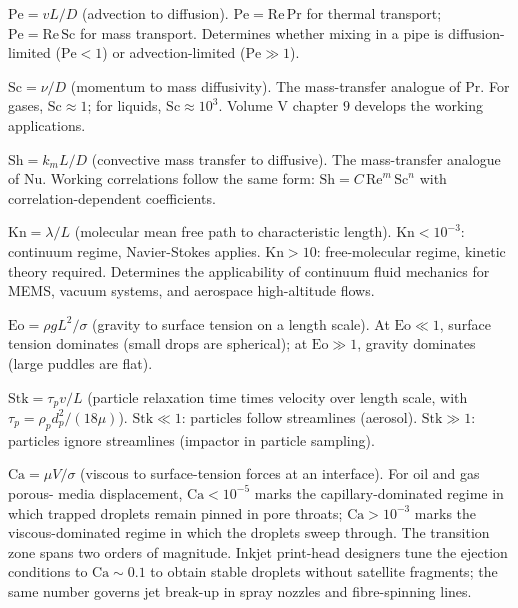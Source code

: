  $\mathrm{Pe} = vL/D$ (advection to
diffusion). $\mathrm{Pe} = \mathrm{Re}\,\mathrm{Pr}$ for thermal
transport; $\mathrm{Pe} = \mathrm{Re}\,\mathrm{Sc}$ for mass
transport. Determines whether mixing in a pipe is diffusion-
limited ($\mathrm{Pe} < 1$) or advection-limited ($\mathrm{Pe}
\gg 1$).

 $\mathrm{Sc} = \nu/D$ (momentum to mass
diffusivity). The mass-transfer analogue of $\mathrm{Pr}$. For
gases, $\mathrm{Sc} \approx 1$; for liquids, $\mathrm{Sc} \approx
10^{3}$. Volume V chapter $9$ develops the working applications.

 $\mathrm{Sh} = k_{m} L/D$ (convective
mass transfer to diffusive). The mass-transfer analogue of
$\mathrm{Nu}$. Working correlations follow the same form:
$\mathrm{Sh} = C\,\mathrm{Re}^{m}\,\mathrm{Sc}^{n}$ with
correlation-dependent coefficients.

 $\mathrm{Kn} = \lambda/L$ (molecular mean
free path to characteristic length). $\mathrm{Kn} < 10^{-3}$:
continuum regime, Navier-Stokes applies. $\mathrm{Kn} > 10$:
free-molecular regime, kinetic theory required. Determines the
applicability of continuum fluid mechanics for MEMS, vacuum
systems, and aerospace high-altitude flows.

 $\mathrm{Eo} = \rho g L^{2}/
\sigma$ (gravity to surface tension on a length scale). At
$\mathrm{Eo} \ll 1$, surface tension dominates (small drops are
spherical); at $\mathrm{Eo} \gg 1$, gravity dominates (large
puddles are flat).

 $\mathrm{Stk} = \tau_{p} v/L$ (particle
relaxation time times velocity over length scale, with $\tau_{p}
= \rho_{p} d_{p}^{2}/(18\mu)$). $\mathrm{Stk} \ll 1$: particles
follow streamlines (aerosol). $\mathrm{Stk} \gg 1$: particles
ignore streamlines (impactor in particle sampling).

 $\mathrm{Ca} = \mu V/\sigma$ (viscous to
surface-tension forces at an interface). For oil and gas porous-
media displacement, $\mathrm{Ca} < 10^{-5}$ marks the
capillary-dominated regime in which trapped droplets remain pinned
in pore throats; $\mathrm{Ca} > 10^{-3}$ marks the viscous-dominated
regime in which the droplets sweep through. The transition zone
spans two orders of magnitude. Inkjet print-head designers tune the
ejection conditions to $\mathrm{Ca} \sim 0.1$ to obtain stable
droplets without satellite fragments; the same number governs jet
break-up in spray nozzles and fibre-spinning lines.

